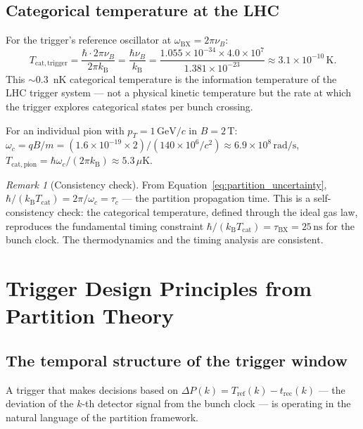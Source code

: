 \documentclass[twocolumn,10pt,a4paper]{article}
\theoremstyle{thmstyle}
\theoremstyle{definition}
\theoremstyle{remark}
\newtheorem{remark}[theorem]{Remark}
\newcommand{\kB}{k_{\mathrm{B}}}
\begin{document}
\subsection{Categorical temperature at the LHC}

For the trigger's reference oscillator at $\omega_{\mathrm{BX}} = 2\pi\nu_B$:
\begin{equation}
T_{\mathrm{cat,trigger}} = \frac{\hbar \cdot 2\pi\nu_B}{2\pi\kB}
= \frac{\hbar \nu_B}{\kB}
= \frac{1.055\times 10^{-34} \times 4.0\times 10^7}{1.381\times 10^{-23}}
\approx 3.1 \times 10^{-10}\,\mathrm{K}.
\label{eq:Tcat_trigger}
\end{equation}
This $\sim 0.3$~nK categorical temperature is the information temperature
of the LHC trigger system — not a physical kinetic temperature but the rate
at which the trigger explores categorical states per bunch crossing.

For an individual pion with $p_T = 1\,\mathrm{GeV}/c$ in $B = 2\,\mathrm{T}$:
$\omega_c = qB/m = (1.6\times 10^{-19} \times 2)/(140\times 10^6/c^2)
\approx 6.9\times 10^8\,\mathrm{rad/s}$,
$T_{\mathrm{cat,pion}} = \hbar\omega_c/(2\pi\kB) \approx 5.3\,\mu\mathrm{K}$.

\begin{remark}[Consistency check]
From Equation~\eqref{eq:partition_uncertainty}, $\hbar/(\kB T_{\mathrm{cat}})
= 2\pi/\omega_c = \tau_c$ — the partition propagation time. This is a
self-consistency check: the categorical temperature, defined through
the ideal gas law, reproduces the fundamental timing constraint
$\hbar/(\kB T_{\mathrm{cat}}) = \tau_{\mathrm{BX}} = 25\,\mathrm{ns}$
for the bunch clock. The thermodynamics and the timing analysis are
consistent.
\end{remark}

\section{Trigger Design Principles from Partition Theory}
\label{sec:design}

\subsection{The temporal structure of the trigger window}

A trigger that makes decisions based on $\Delta P(k) = T_{\mathrm{ref}}(k)
- t_{\mathrm{rec}}(k)$ — the deviation of the $k$-th detector signal from
the bunch clock — is operating in the natural language of the partition
framework.
\end{document}
